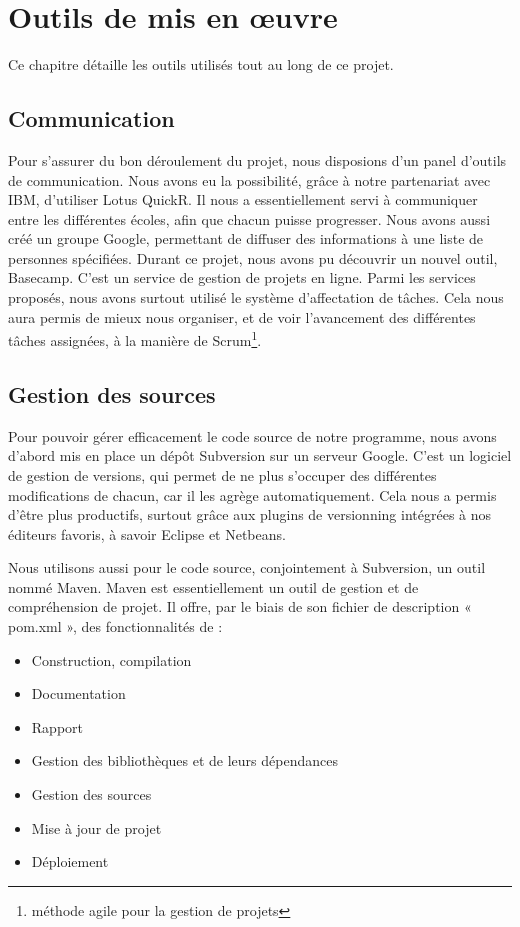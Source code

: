 \chapter{Outils de mis en \oe{}uvre}
\minitoc

Ce chapitre détaille les outils utilisés tout au long de ce projet.

\section{Communication}

Pour s'assurer du bon déroulement du projet, nous disposions d'un panel d’outils de communication.
Nous avons eu la possibilité, grâce à notre partenariat avec IBM, d’utiliser Lotus QuickR.
Il nous a essentiellement servi à communiquer entre les différentes écoles, afin que chacun puisse progresser.
Nous avons aussi créé un groupe Google, permettant de diffuser des informations à une liste de personnes spécifiées.
Durant ce projet, nous avons pu découvrir un nouvel outil, Basecamp.
C'est un service de gestion de projets en ligne.
Parmi les services proposés, nous avons surtout utilisé le système d'affectation de tâches.
Cela nous aura permis de mieux nous organiser, et de voir l’avancement des différentes tâches assignées, à la manière de Scrum\footnote{méthode agile pour la gestion de projets}.

\section{Gestion des sources}

Pour pouvoir gérer efficacement le code source de notre programme, nous avons d’abord mis en place un dépôt Subversion sur un serveur Google.
C’est un logiciel de gestion de versions, qui permet de ne plus s’occuper des différentes modifications de chacun, car il les agrège automatiquement.
Cela nous a permis d’être plus productifs, surtout grâce aux plugins de versionning intégrées à nos éditeurs favoris, à savoir Eclipse et Netbeans.


Nous utilisons aussi pour le code source, conjointement à Subversion, un outil nommé Maven.
Maven est essentiellement un outil de gestion et de compréhension de projet.
Il offre, par le biais de son fichier de description « pom.xml »,  des fonctionnalités de :
\begin{itemize}
\item Construction, compilation
\item Documentation
\item Rapport
\item Gestion des bibliothèques et de leurs dépendances
\item Gestion des sources
\item Mise à jour de projet
\item Déploiement
\end{itemize}

